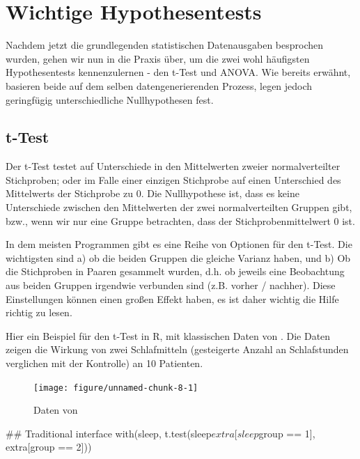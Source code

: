 \documentclass[a4paper,twoside]{tufte-book}\usepackage[]{graphicx}\usepackage[]{color}
\begin{document}
\section{Wichtige Hypothesentests}

Nachdem jetzt die grundlegenden statistischen Datenausgaben besprochen wurden, gehen wir nun in die Praxis über, um die zwei wohl häufigsten Hypothesentests kennenzulernen - den t-Test und ANOVA. Wie bereits erwähnt, basieren beide auf dem selben datengenerierenden Prozess, legen jedoch geringfügig unterschiedliche Nullhypothesen fest.

\subsection{t-Test}

Der t-Test testet auf Unterschiede in den Mittelwerten zweier normalverteilter Stichproben; oder im Falle einer einzigen Stichprobe auf einen Unterschied des Mittelwerts der Stichprobe zu 0. Die Nullhypothese ist, dass es keine Unterschiede zwischen den Mittelwerten der zwei normalverteilten Gruppen gibt, bzw., wenn wir nur eine Gruppe betrachten, dass der Stichprobenmittelwert 0 ist. 

In dem meisten Programmen gibt es eine Reihe von Optionen für den t-Test. Die wichtigsten sind a) ob die beiden Gruppen die gleiche Varianz haben, und b) Ob die Stichproben in Paaren gesammelt wurden, d.h. ob jeweils eine Beobachtung aus beiden Gruppen irgendwie verbunden sind (z.B. vorher / nachher). Diese Einstellungen können einen großen Effekt haben, es ist daher wichtig die Hilfe richtig zu lesen. 

Hier ein Beispiel für den t-Test in R, mit klassischen Daten von \citet{Student-probableerrormean-1908}. Die Daten zeigen die Wirkung von zwei Schlafmitteln (gesteigerte Anzahl an Schlafstunden verglichen mit der Kontrolle) an 10 Patienten. 



\begin{figure}[htbp]
\begin{center}
\begin{Schunk}

\texttt{[image: figure/unnamed-chunk-8-1]} \end{Schunk}
\caption{Daten von \citet{Student-probableerrormean-1908}}
\label{fig: Student Sleep Data}
\end{center}
\end{figure}

\begin{Schunk}
\begin{Sinput}
## Traditional interface
with(sleep, t.test(sleep$extra[sleep$group == 1], extra[group == 2]))
\end{Sinput}
\end{Schunk}
\end{document}
